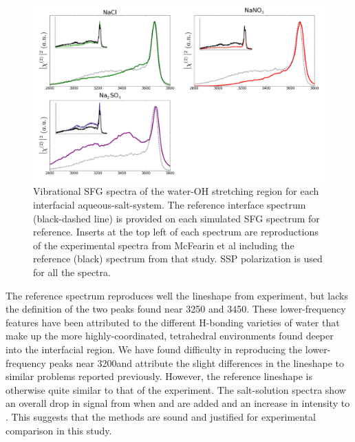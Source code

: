 \begin{figure}[h!]
\begin{center}
	\includegraphics[scale=1.0]{images/sfg-spectra.png}
	\caption{Vibrational SFG spectra of the water-OH stretching region for each interfacial aqueous-salt-\ctc system. The reference \ctcwat interface spectrum (black-dashed line) is provided on each simulated SFG spectrum for reference. Inserts at the top left of each spectrum are reproductions of the experimental spectra from McFearin et al\cite{McFearin2009} including the reference (black) spectrum from that study. SSP polarization is used for all the spectra.}
	\label{fig:sfg-spectra}
\end{center}
\end{figure}

The reference \ctcwat spectrum reproduces well the lineshape from experiment, but lacks the definition of the two peaks found near 3250 and 3450\cm. These lower-frequency features have been attributed to the different H-bonding varieties of water that make up the more highly-coordinated, tetrahedral environments found deeper into the interfacial region. We have found difficulty in reproducing the lower-frequency peaks near 3200\cm and attribute the slight differences in the lineshape to similar problems reported previously.\cite{Walker2006b} However, the reference \ctcwat lineshape is otherwise quite similar to that of the experiment. The salt-solution spectra show an overall drop in signal from when \cl and \nit are added and an increase in intensity to \sul. This suggests that the methods are sound and justified for experimental comparison in this study.

